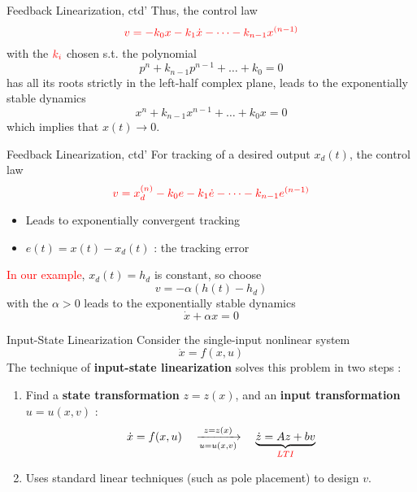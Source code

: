 \documentclass{beamer}
\begin{document}
  \begin{frame}{Feedback Linearization, ctd'}
    Thus, the control law
    $$ {\color{red}v = -k_{0}x-k_{1}\dot{x}- \dots - k_{n-1}x^{(n-1)}} $$
    with the ${\color{red}k_{i}}$ chosen s.t. the polynomial
    $$p^{n}+k_{n-1}p^{n-1} + \dots + k_{0}=0$$ 
    has all its roots strictly in the left-half complex plane, leads to the {\color{red}exponentially stable dynamics}
    $$
    x^{n}+k_{n-1}x^{n-1}+\dots+k_{0}x = 0
    $$
    which implies that $x(t) \rightarrow 0$.
  \end{frame}


  \begin{frame}{Feedback Linearization, ctd'}
    For tracking of a desired output $x_{d}(t)$, the control law
    \begin{equation}\label{tracking}
      {\color{red}v = x_{d}^{(n)} - k_{0}e - k_{1}\dot{e}-\dots-k_{n-1}e^{(n-1)}}
    \end{equation}
    \vspace{-20pt}
    \begin{itemize}
        \item Leads to exponentially convergent tracking
        \item $e(t) = x(t)-x_{d}(t)$ : the tracking error
    \end{itemize}
    \textcolor{red}{In our example}, $x_{d}(t)=h_{d}$ is constant, so choose
    $$v=-\alpha(h(t) - h_{d})$$
    with the $\alpha > 0$ leads to the exponentially stable dynamics
    $$ \dot{x} + \alpha x=0 $$
  \end{frame}


  \begin{frame}{Input-State Linearization}
    Consider the single-input nonlinear system
    $$ \dot{x} = f(x,u) $$
    The technique of \textbf{input-state linearization} solves this problem in two steps :
    \begin{enumerate}
      \item Find a \textbf{state transformation} $z=z(x)$, and an \textbf{input transformation} $u=u(x,v)$ :
          $$ \dot{x} = f(x,u) \quad \xrightarrow[u=u(x,v)]{z=z(x)} \quad \underbrace{\dot{z}=Az+bv}_{{\color{red}LTI}} $$
      \item Uses standard linear techniques (such as pole placement) to design $v$.
    \end{enumerate}
  \end{frame}
\end{document}
